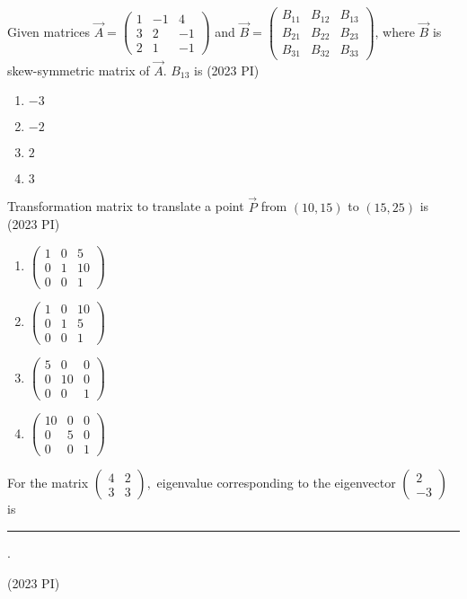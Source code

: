 \item Given matrices
$
\vec{A} = \begin{pmatrix}
1 & -1 & 4 \\
3 & 2 & -1 \\
2 & 1 & -1
\end{pmatrix}
$
and 
$
\vec{B} = \begin{pmatrix}
B_{11} & B_{12} & B_{13} \\
B_{21} & B_{22} & B_{23} \\
B_{31} & B_{32} & B_{33}
\end{pmatrix}
$, where
$\vec{B}$ is skew-symmetric matrix of $\vec{A}$. $B_{13}$ is
\hfill(2023 PI)
\begin{multicols}{4}
\begin{enumerate}
    \item $-3$
    \item $-2$
    \item $2$
    \item $3$
\end{enumerate}
\end{multicols}
\item Transformation matrix to translate a point $\vec{P}$ from $(10, 15)$ to $(15, 25)$ is
\hfill(2023 PI)
\begin{multicols}{4}
\begin{enumerate}
    \item $
    \begin{pmatrix}
    1 & 0 & 5 \\
    0 & 1 & 10 \\
    0 & 0 & 1
    \end{pmatrix}
    $
    \item $
    \begin{pmatrix}
    1 & 0 & 10 \\
    0 & 1 & 5 \\
    0 & 0 & 1
    \end{pmatrix}
    $
    \item $
    \begin{pmatrix}
    5 & 0 & 0 \\
    0 & 10 & 0 \\
    0 & 0 & 1
    \end{pmatrix}
    $
    \item $
    \begin{pmatrix}
    10 & 0 & 0 \\
    0 & 5 & 0 \\
    0 & 0 & 1
    \end{pmatrix}
    $
\end{enumerate}
\end{multicols}
\item For the matrix 
$
\begin{pmatrix}
4 & 2 \\
3 & 3
\end{pmatrix},
$
eigenvalue corresponding to the eigenvector 
\(
\begin{pmatrix}
2 \\
-3
\end{pmatrix}
\)
is \rule{1cm}{0.15mm}. 

\hfill(2023 PI)

